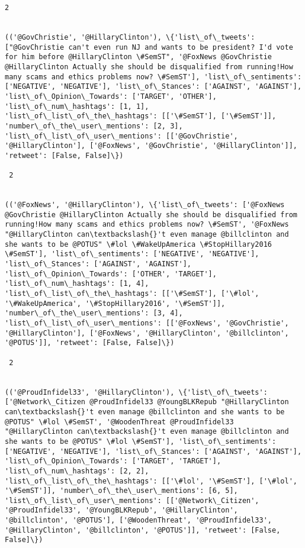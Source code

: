 \documentclass[11pt]{article}
\begin{document}
\begin{Verbatim}[commandchars=\\\{\}]
 2
 

(('@GovChristie', '@HillaryClinton'), \{'list\_of\_tweets': ["@GovChristie can't even run NJ and wants to be president? I'd vote for him before @HillaryClinton \#SemST", '@FoxNews @GovChristie @HillaryClinton Actually she should be disqualified from running!How many scams and ethics problems now? \#SemST'], 'list\_of\_sentiments': ['NEGATIVE', 'NEGATIVE'], 'list\_of\_Stances': ['AGAINST', 'AGAINST'], 'list\_of\_Opinion\_Towards': ['TARGET', 'OTHER'], 'list\_of\_num\_hashtags': [1, 1], 'list\_of\_list\_of\_the\_hashtags': [['\#SemST'], ['\#SemST']], 'number\_of\_the\_user\_mentions': [2, 3], 'list\_of\_list\_of\_user\_mentions': [['@GovChristie', '@HillaryClinton'], ['@FoxNews', '@GovChristie', '@HillaryClinton']], 'retweet': [False, False]\})

 2
 

(('@FoxNews', '@HillaryClinton'), \{'list\_of\_tweets': ['@FoxNews @GovChristie @HillaryClinton Actually she should be disqualified from running!How many scams and ethics problems now? \#SemST', '@FoxNews  "@HillaryClinton can\textbackslash{}'t even manage @billclinton and she wants to be @POTUS" \#lol \#WakeUpAmerica \#StopHillary2016 \#SemST'], 'list\_of\_sentiments': ['NEGATIVE', 'NEGATIVE'], 'list\_of\_Stances': ['AGAINST', 'AGAINST'], 'list\_of\_Opinion\_Towards': ['OTHER', 'TARGET'], 'list\_of\_num\_hashtags': [1, 4], 'list\_of\_list\_of\_the\_hashtags': [['\#SemST'], ['\#lol', '\#WakeUpAmerica', '\#StopHillary2016', '\#SemST']], 'number\_of\_the\_user\_mentions': [3, 4], 'list\_of\_list\_of\_user\_mentions': [['@FoxNews', '@GovChristie', '@HillaryClinton'], ['@FoxNews', '@HillaryClinton', '@billclinton', '@POTUS']], 'retweet': [False, False]\})

 2
 

(('@ProudInfidel33', '@HillaryClinton'), \{'list\_of\_tweets': ['@Network\_Citizen @ProudInfidel33 @YoungBLKRepub "@HillaryClinton can\textbackslash{}'t even manage @billclinton and she wants to be @POTUS" \#lol \#SemST', '@WoodenThreat @ProudInfidel33 "@HillaryClinton can\textbackslash{}'t even manage @billclinton and she wants to be @POTUS" \#lol \#SemST'], 'list\_of\_sentiments': ['NEGATIVE', 'NEGATIVE'], 'list\_of\_Stances': ['AGAINST', 'AGAINST'], 'list\_of\_Opinion\_Towards': ['TARGET', 'TARGET'], 'list\_of\_num\_hashtags': [2, 2], 'list\_of\_list\_of\_the\_hashtags': [['\#lol', '\#SemST'], ['\#lol', '\#SemST']], 'number\_of\_the\_user\_mentions': [6, 5], 'list\_of\_list\_of\_user\_mentions': [['@Network\_Citizen', '@ProudInfidel33', '@YoungBLKRepub', '@HillaryClinton', '@billclinton', '@POTUS'], ['@WoodenThreat', '@ProudInfidel33', '@HillaryClinton', '@billclinton', '@POTUS']], 'retweet': [False, False]\})


\end{Verbatim}
\end{document}
